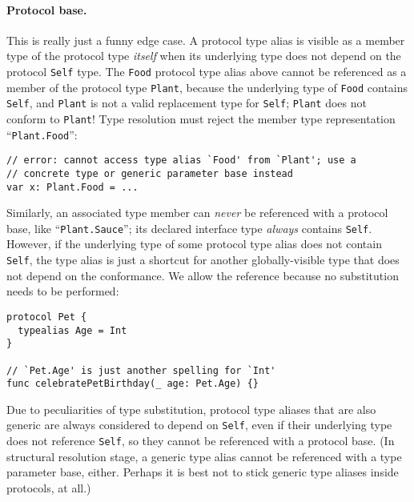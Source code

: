 \documentclass[../generics]{subfiles}
\begin{document}
\paragraph{Protocol base.} This is really just a funny edge case. A protocol type alias is visible as a member type of the protocol type \emph{itself} when its underlying type does not depend on the protocol \texttt{Self} type. The \texttt{Food} protocol type alias above cannot be referenced as a member of the protocol type \texttt{Plant}, because the underlying type of \texttt{Food} contains \texttt{Self}, and \texttt{Plant} is not a valid replacement type for \texttt{Self}; \texttt{Plant} does not conform to \texttt{Plant}! Type resolution must reject the member type representation ``\texttt{Plant.Food}'':
\begin{Verbatim}
// error: cannot access type alias `Food' from `Plant'; use a
// concrete type or generic parameter base instead
var x: Plant.Food = ...
\end{Verbatim}
Similarly, an associated type member can \emph{never} be referenced with a protocol base, like ``\texttt{Plant.Sauce}''; its declared interface type \emph{always} contains \texttt{Self}. However, if the underlying type of some protocol type alias does not contain \texttt{Self}, the type alias is just a shortcut for another globally-visible type that does not depend on the conformance. We allow the reference because no substitution needs to be performed:
\begin{Verbatim}
protocol Pet {
  typealias Age = Int
}

// `Pet.Age' is just another spelling for `Int'
func celebratePetBirthday(_ age: Pet.Age) {}
\end{Verbatim}

Due to peculiarities of type substitution, protocol type aliases that are also generic are always considered to depend on \texttt{Self}, even if their underlying type does not reference \texttt{Self}, so they cannot be referenced with a protocol base. (In structural resolution stage, a generic type alias cannot be referenced with a type parameter base, either. Perhaps it is best not to stick generic type aliases inside protocols, at all.)
\end{document}
